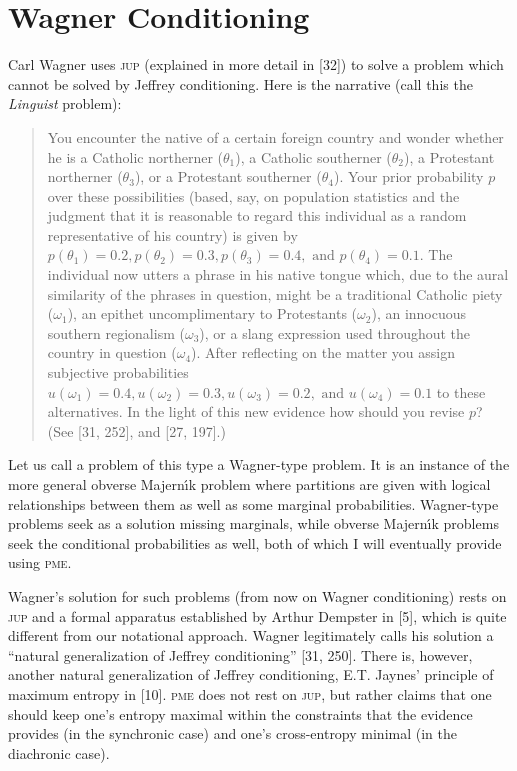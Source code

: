 \documentclass[entropy,article,submit,oneauthor,pdftex,12pt,a4paper]{mdpi}
\newcommand{\qeins}[1]{``#1''}
\newenvironment{quotex}{\begin{quote}\begin{footnotesize}}{\end{footnotesize}\end{quote}}
\begin{document}
\section{Wagner Conditioning}
\label{wc}

Carl Wagner uses \textsc{jup} (explained in more detail in [32]) to
solve a problem which cannot be solved by Jeffrey conditioning. Here
is the narrative (call this the \emph{Linguist} problem):

\begin{quotex}
  You encounter the native of a certain foreign country and wonder
  whether he is a Catholic northerner ($\theta_{1}$), a Catholic
  southerner ($\theta_{2}$), a Protestant northerner ($\theta_{3}$),
  or a Protestant southerner ($\theta_{4}$). Your prior probability
  $p$ over these possibilities (based, say, on population statistics
  and the judgment that it is reasonable to regard this individual as
  a random representative of his country) is given by
  $p(\theta_{1})=0.2,p(\theta_{2})=0.3,p(\theta_{3})=0.4,\mbox{ and
  }p(\theta_{4})=0.1$. The individual now utters a phrase in his
  native tongue which, due to the aural similarity of the phrases in
  question, might be a traditional Catholic piety ($\omega_{1}$), an
  epithet uncomplimentary to Protestants ($\omega_{2}$), an innocuous
  southern regionalism ($\omega_{3}$), or a slang expression used
  throughout the country in question ($\omega_{4}$). After reflecting
  on the matter you assign subjective probabilities
  $u(\omega_{1})=0.4,u(\omega_{2})=0.3,u(\omega_{3})=0.2,\mbox{ and
  }u(\omega_{4})=0.1$ to these alternatives. In the light of this new
  evidence how should you revise $p$? (See [31, 252], and [27, 197].)
\end{quotex}

Let us call a problem of this type a Wagner-type problem. It is an
instance of the more general obverse Majern{\'\i}k problem where partitions
are given with logical relationships between them as well as some
marginal probabilities. Wagner-type problems seek as a solution
missing marginals, while obverse Majern{\'\i}k problems seek the
conditional probabilities as well, both of which I will eventually
provide using \textsc{pme}.

Wagner's solution for such problems (from now on Wagner conditioning)
rests on \textsc{jup} and a formal apparatus established by Arthur
Dempster in [5], which is quite different from our notational
approach. Wagner legitimately calls his solution a \qeins{natural
  generalization of Jeffrey conditioning} [31, 250]. There is,
however, another natural generalization of Jeffrey conditioning, E.T.
Jaynes' principle of maximum entropy in [10]. \textsc{pme} does not
rest on \textsc{jup}, but rather claims that one should keep one's
entropy maximal within the constraints that the evidence provides (in
the synchronic case) and one's cross-entropy minimal (in the
diachronic case).
\end{document}
